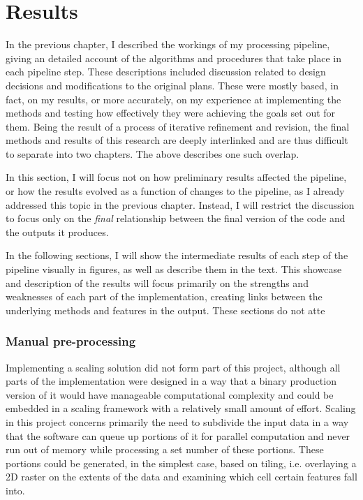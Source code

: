 
\chapter{Results}
\label{chap:r}

In the previous chapter, I described the workings of my processing pipeline, giving an detailed account of the algorithms and procedures that take place in each pipeline step. These descriptions included discussion related to design decisions and modifications to the original plans. These were mostly based, in fact, on my results, or more accurately, on my experience at implementing the methods and testing how effectively they were achieving the goals set out for them. Being the result of a process of iterative refinement and revision, the final methods and results of this research are deeply interlinked and are thus difficult to separate into two chapters. The above describes one such overlap.

In this section, I will focus not on how preliminary results affected the pipeline, or how the results evolved as a function of changes to the pipeline, as I already addressed this topic in the previous chapter. Instead, I will restrict the discussion to focus only on the \textit{final} relationship between the final version of the code and the outputs it produces.

In the following sections, I will show the intermediate results of each step of the pipeline visually in figures, as well as describe them in the text. This showcase and description of the results will focus primarily on the strengths and weaknesses of each part of the implementation, creating links between the underlying methods and features in the output. These sections do not atte

\subsection{Manual pre-processing}
\label{sub:manualpreprocessing}

Implementing a scaling solution did not form part of this project, although all parts of the implementation were designed in a way that a binary production version of it would have manageable computational complexity and could be embedded in a scaling framework with a relatively small amount of effort. Scaling in this project concerns primarily the need to subdivide the input data in a way that the software can queue up portions of it for parallel computation and never run out of memory while processing a set number of these portions. These portions could be generated, in the simplest case, based on tiling, i.e. overlaying a 2D raster on the extents of the data and examining which cell certain features fall into. 

